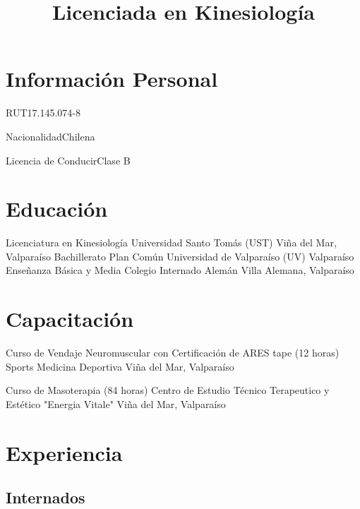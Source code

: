 \documentclass[11pt,a4paper,sans]{moderncv}
\title{Licenciada en Kinesiología}
\begin{document}
\maketitle

\section{Información Personal}

	   {RUT}{17.145.074-8}

	   {Nacionalidad}{Chilena}

	   {Licencia de Conducir}{Clase B}
	   
\section{Educación}

        {Licenciatura en Kinesiología}
        {Universidad Santo Tomás (UST)}
        {Viña del Mar, Valparaíso}
        {}
        {}
        {Bachillerato Plan Común}
        {Universidad de Valparaíso (UV)}
        {Valparaíso}
        {}
        {}
        {Enseñanza Básica y Media}
        {Colegio Internado Alemán}
        {Villa Alemana, Valparaíso}
        {}{}
        
\section{Capacitación}

        {Curso de Vendaje Neuromuscular con Certificación de ARES tape (12 horas)}
        {Sports Medicina Deportiva}
        {Viña del Mar, Valparaíso}
        {}
        {}

        {Curso de Masoterapia (84 horas)}
        {Centro de Estudio Técnico Terapeutico y Estético "Energia Vitale"}
        {Viña del Mar, Valparaíso}
        {}
        {}

\section{Experiencia}
\subsection{Internados}
        
\end{document}
